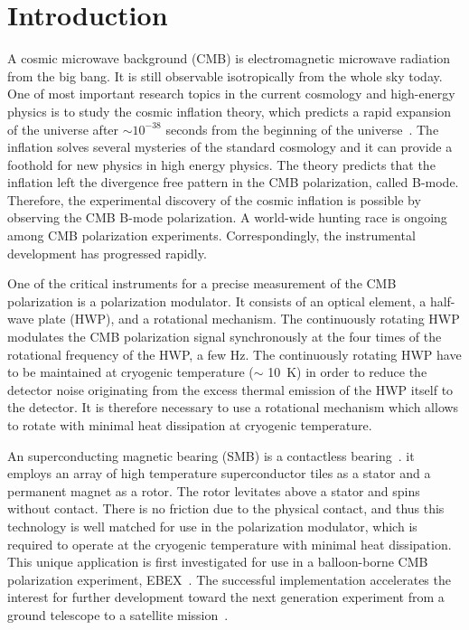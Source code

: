 \documentclass[a4paper,11pt]{jpconf}
\begin{document}
\section{Introduction}

A cosmic microwave background (CMB) is electromagnetic microwave radiation from the big bang.
It is still observable isotropically from the whole sky today.
One of most important research topics in the current cosmology and high-energy physics is to study the cosmic inflation theory, which predicts a rapid expansion of the universe after $\sim 10^{-38}$ seconds from the beginning of the universe~\cite{inflation_sato,inflation_guth}.
The inflation solves several mysteries of the standard cosmology and it can provide a foothold for new physics in high energy physics.
The theory predicts that the inflation left the divergence free pattern in the CMB polarization,  called B-mode.
Therefore, the experimental discovery of the cosmic inflation is possible by observing the CMB B-mode polarization.
A world-wide hunting race is ongoing among CMB polarization experiments.
Correspondingly, the instrumental development has progressed rapidly.

One of the critical instruments for a precise measurement of the CMB polarization is a polarization modulator.
It consists of an optical element, a half-wave plate (HWP), and a rotational mechanism.
The continuously rotating HWP modulates the CMB polarization signal synchronously at the four times of the rotational frequency of the HWP, a few Hz.
The continuously rotating HWP have to be maintained at cryogenic temperature ($\sim$ 10~K) in order to reduce the detector noise originating from the excess thermal emission of the HWP itself to the detector.
It is therefore necessary to use a rotational mechanism which allows to rotate with minimal heat dissipation at cryogenic temperature.

An superconducting magnetic bearing (SMB) is a contactless bearing~\cite{smb}.
it employs an array of high temperature superconductor tiles as a stator and a permanent magnet as a rotor.
The rotor levitates above a stator and spins without contact.
There is no friction due to the physical contact, and thus this technology is well matched for use in the polarization modulator, which is required to operate at the cryogenic temperature with minimal heat dissipation.
This unique application is first investigated for use in a balloon-borne CMB polarization experiment, EBEX~\cite{ebex}.
The successful implementation accelerates the interest for further development toward the next generation experiment from a ground telescope to a satellite mission~\cite{litebird}.
\end{document}
